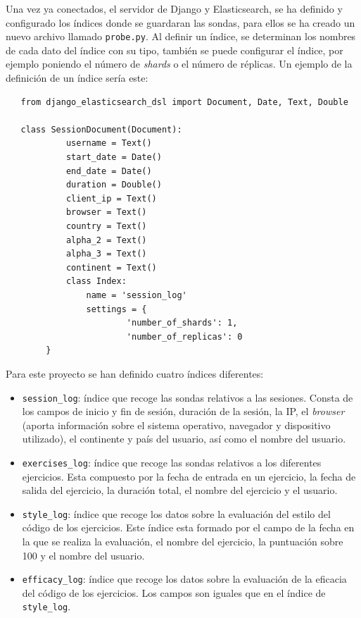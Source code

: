   Una vez ya conectados, el servidor de Django y Elasticsearch, se ha definido y configurado los índices donde se guardaran las sondas, para ellos se ha creado un nuevo archivo llamado \texttt{probe.py}. Al definir un índice, se determinan los nombres de cada dato del índice con su tipo, también se puede configurar el índice, por ejemplo poniendo el número de\textit{ shards }o el número de réplicas. Un ejemplo de la definición de un índice sería este: \\

\begin{lstlisting}
   from django_elasticsearch_dsl import Document, Date, Text, Double
   
   class SessionDocument(Document):
    		username = Text()
  	  		start_date = Date()
   			end_date = Date()
    		duration = Double()
    		client_ip = Text()
    		browser = Text()
    		country = Text()
    		alpha_2 = Text()
    		alpha_3 = Text()
    		continent = Text()
    		class Index:
        		name = 'session_log'
        		settings = {
            			'number_of_shards': 1,
           				'number_of_replicas': 0
        }
\end{lstlisting} 
 \newpage
Para este proyecto se han definido cuatro índices diferentes:

\begin{itemize}
\item \texttt{session\_log}: índice que recoge las sondas relativos a las sesiones. Consta de los campos de inicio y fin de sesión, duración de la sesión, la IP, el \textit{browser} (aporta información sobre el sistema operativo, navegador y dispositivo utilizado), el continente y país del usuario, así como el nombre del usuario.
\item \texttt{exercises\_log}: índice que recoge las sondas relativos a los diferentes ejercicios. Esta compuesto por la fecha de entrada en un ejercicio, la fecha de salida del ejercicio, la duración total, el nombre del ejercicio y el usuario.
\item \texttt{style\_log}: índice que recoge los datos sobre la evaluación del estilo del código de los ejercicios. Este índice esta formado por el campo de la fecha en la que se realiza la evaluación, el nombre del ejercicio, la puntuación sobre 100 y el nombre del usuario.
\item \texttt{efficacy\_log}: índice que recoge los datos sobre la evaluación de la eficacia del código de los ejercicios. Los campos son iguales que en el índice de \texttt{style\_log}.
\end{itemize}

